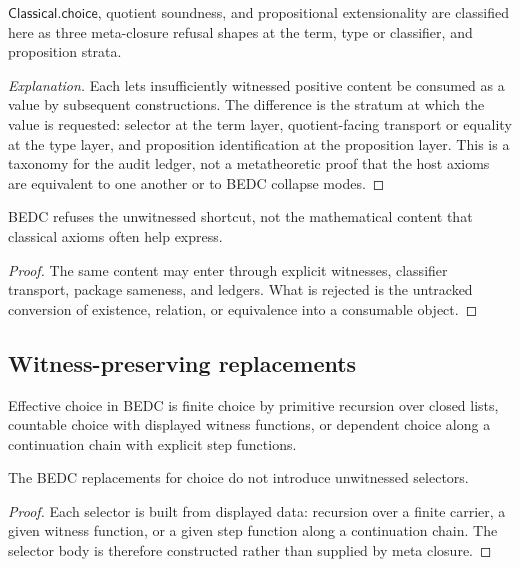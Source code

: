\begin{principle}
\label{thm:philosophy-three-classical-axioms-one-schema}
\(\mathsf{Classical.choice}\), quotient soundness, and propositional
extensionality are classified here as three meta-closure refusal shapes
at the term, type or classifier, and proposition strata.
\end{principle}
\begin{proof}[Explanation]
Each lets insufficiently witnessed positive content be consumed as a
value by subsequent constructions. The difference is the stratum at
which the value is requested: selector at the term layer, quotient-facing
transport or equality at the type layer, and proposition identification
at the proposition layer. This is a taxonomy for the audit ledger, not a
metatheoretic proof that the host axioms are equivalent to one another or
to BEDC collapse modes.
\end{proof}

\begin{corollary}
\label{cor:philosophy-axiom-refusal-not-content-refusal}
BEDC refuses the unwitnessed shortcut, not the mathematical content
that classical axioms often help express.
\end{corollary}
\begin{proof}
The same content may enter through explicit witnesses, classifier
transport, package sameness, and ledgers. What is rejected is the
untracked conversion of existence, relation, or equivalence into a
consumable object.
\end{proof}

\subsection{Witness-preserving replacements}
\label{subsec:philosophy-witness-preserving-replacements}

\begin{definition}
\label{def:philosophy-effective-choice}
Effective choice in BEDC is finite choice by primitive recursion over
closed lists, countable choice with displayed witness functions, or
dependent choice along a continuation chain with explicit step
functions.
\end{definition}

\begin{theorem}
\label{thm:philosophy-effective-choice-preserves-witnesses}
The BEDC replacements for choice do not introduce unwitnessed
selectors.
\end{theorem}
\begin{proof}
Each selector is built from displayed data: recursion over a finite
carrier, a given witness function, or a given step function along a
continuation chain. The selector body is therefore constructed rather
than supplied by meta closure.
\end{proof}

